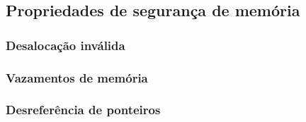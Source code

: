 \subsection{Propriedades de segurança de memória}
\subsubsection{Desalocação inválida}
\subsubsection{Vazamentos de memória}
\subsubsection{Desreferência de ponteiros}

